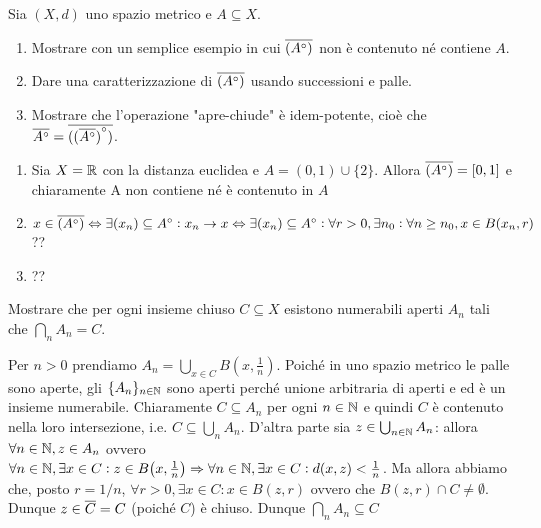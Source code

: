 \begin{es}
  Sia $ (X, d) $ uno spazio metrico e $ A \subseteq X $.
  \begin{enumerate}[label = (\roman*)]
  \item Mostrare con un semplice esempio in cui $ \overline{({A}^{\circ})} $ non è contenuto né contiene $ A $.
  \item Dare una caratterizzazione di $ \overline{({A}^{\circ})} $ usando successioni e palle.
  \item Mostrare che l'operazione "apre-chiude" è idem-potente, cioè che $ \overline{{A}^{\circ}} = \overline{({(\overline{{A}^{\circ}})}^{\circ})} $.
  \end{enumerate}
\end{es}
%
\begin{enumerate}[label = (\roman*)]
\item Sia $ X = \mathbb{R} $ con la distanza euclidea e $ A = (0, 1) \cup \{2\} $. Allora $ \overline{({A}^{\circ})} = [0, 1] $ e chiaramente A non contiene né è contenuto in $ A $
\item $ x \in \overline{({A}^{\circ})} \Leftrightarrow \exists (x_n) \subseteq {A}^{\circ} : x_n \to x \Leftrightarrow \exists (x_n) \subseteq {A}^{\circ} : \forall r > 0, \exists n_0 : \forall n \geq n_0, x \in B(x_n, r) $ ??
\item ??
\end{enumerate}

\begin{es}
  Mostrare che per ogni insieme chiuso $ C \subseteq X $ esistono numerabili aperti $ A_n $ tali che $ \bigcap_{n} A_n = C $. \\
\end{es}
%
Per $ n > 0 $ prendiamo $ A_n = \bigcup_{x \in C} B{\left(x, \frac{1}{n}\right)} $. Poiché in uno spazio metrico le palle sono aperte, gli $ \{A_n\}_{n \in \mathbb{N}} $ sono aperti perché unione arbitraria di aperti e ed è
un insieme numerabile. Chiaramente $ C \subseteq A_n $ per ogni $ n \in \mathbb{N} $ e quindi $ C $ è contenuto nella loro intersezione, i.e. $ C \subseteq \bigcup_{n} A_n $. D'altra parte sia $ z \in \bigcup_{n \in \mathbb{N}} A_n $: allora $ \forall n \in \mathbb{N}, z \in A_n $ ovvero $ \forall n \in \mathbb{N}, \exists x \in C : z \in B{\left(x, \frac{1}{n}\right)} \Rightarrow \forall n \in \mathbb{N}, \exists x \in C : d(x, z) < \frac{1}{n} $. Ma allora abbiamo che, posto $ r = 1/n $, $ \forall r > 0, \exists x \in C : x \in B(z, r) $ ovvero che $ B(z, r) \cap C \neq \emptyset $. Dunque $ z \in \overline{C} = C $ (poiché $ C $) è chiuso. Dunque $ \bigcap_{n} A_n \subseteq C $

